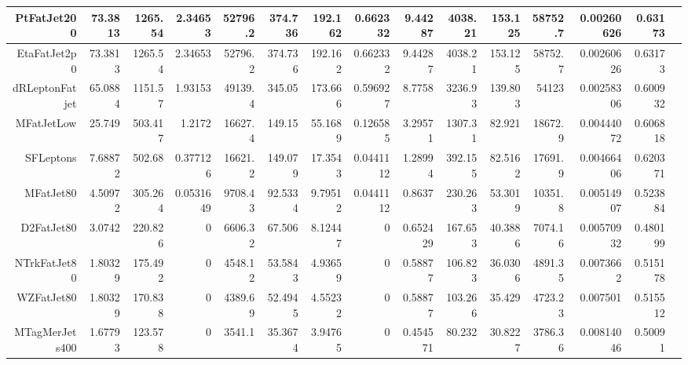 \begin{table}[ht!]
\begin{center}
{\begin{tabular}{ r ||  r  r  r  r  r  r  r  r  r  || r r r r r |}
PtFatJet200 & 73.3813 & 1265.54 & 2.34653 & 52796.2 & 374.736 & 192.162 & 0.662332 & 9.44287 & 4038.21  & 153.125&58752.7&0.00260626 & 0.63173\tabularnewline \hline
EtaFatJet2p0 & 73.3813 & 1265.54 & 2.34653 & 52796.2 & 374.736 & 192.162 & 0.662332 & 9.44287 & 4038.21  & 153.125&58752.7&0.00260626 & 0.63173\tabularnewline \hline
dRLeptonFatjet & 65.0884 & 1151.57 & 1.93153 & 49139.4 & 345.05 & 173.666 & 0.596927 & 8.7758 & 3236.93  & 139.803&54123&0.00258306 & 0.600932\tabularnewline \hline
MFatJetLow & 25.749 & 503.417 & 1.2172 & 16627.4 & 149.15 & 55.1689 & 0.126585 & 3.29571 & 1307.31 & 82.921 &18672.9&0.00444072 & 0.606818\tabularnewline \hline
SFLeptons & 7.68872 & 502.68 & 0.377126 & 16621.2 & 149.079 & 17.3543 & 0.0441112 & 1.28994 & 392.155 & 82.5162 &17691.9&0.00466406 & 0.620371\tabularnewline \hline
MFatJet80 & 4.50972 & 305.264 & 0.0531649 & 9708.43 & 92.5334 & 9.79512 & 0.0441112 & 0.8637 & 230.263 & 53.3019 &10351.8&0.00514907 & 0.523884\tabularnewline \hline
D2FatJet80 & 3.0742 & 220.826 & 0 & 6606.32 & 67.506 & 8.12447 & 0 & 0.652429 & 167.653 & 40.3886 &7074.16&0.00570932 & 0.480199\tabularnewline \hline
NTrkFatJet80 & 1.80329 & 175.492 & 0 & 4548.12 & 53.5843 & 4.93659 & 0 & 0.58877 & 106.823 & 36.0306 &4891.35&0.0073662 & 0.515178\tabularnewline \hline
WZFatJet80 & 1.80329 & 170.838 & 0 & 4389.69 & 52.4945 & 4.55232 & 0 & 0.58877 & 103.266 & 35.429 &4723.23&0.007501 & 0.515512\tabularnewline \hline
MTagMerJets400 & 1.67793 & 123.578 & 0 & 3541.1 & 35.3674 & 3.94765 & 0 & 0.454571 & 80.232 & 30.8227 &3786.36&0.00814046 & 0.50091\tabularnewline \hline
\end{tabular}

}
\end{center}
\end{table}
%
